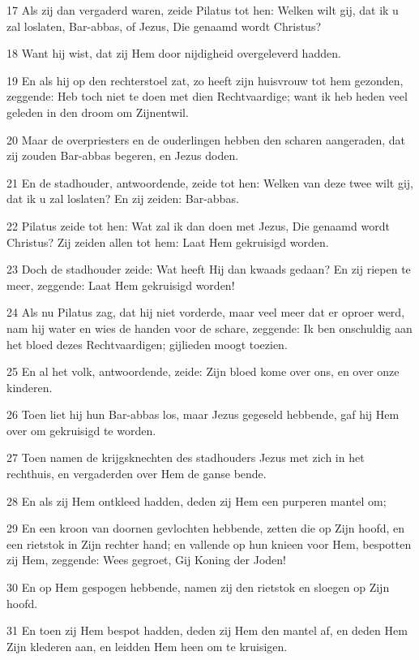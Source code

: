 \par 17 Als zij dan vergaderd waren, zeide Pilatus tot hen: Welken wilt gij, dat ik u zal loslaten, Bar-abbas, of Jezus, Die genaamd wordt Christus?
\par 18 Want hij wist, dat zij Hem door nijdigheid overgeleverd hadden.
\par 19 En als hij op den rechterstoel zat, zo heeft zijn huisvrouw tot hem gezonden, zeggende: Heb toch niet te doen met dien Rechtvaardige; want ik heb heden veel geleden in den droom om Zijnentwil.
\par 20 Maar de overpriesters en de ouderlingen hebben den scharen aangeraden, dat zij zouden Bar-abbas begeren, en Jezus doden.
\par 21 En de stadhouder, antwoordende, zeide tot hen: Welken van deze twee wilt gij, dat ik u zal loslaten? En zij zeiden: Bar-abbas.
\par 22 Pilatus zeide tot hen: Wat zal ik dan doen met Jezus, Die genaamd wordt Christus? Zij zeiden allen tot hem: Laat Hem gekruisigd worden.
\par 23 Doch de stadhouder zeide: Wat heeft Hij dan kwaads gedaan? En zij riepen te meer, zeggende: Laat Hem gekruisigd worden!
\par 24 Als nu Pilatus zag, dat hij niet vorderde, maar veel meer dat er oproer werd, nam hij water en wies de handen voor de schare, zeggende: Ik ben onschuldig aan het bloed dezes Rechtvaardigen; gijlieden moogt toezien.
\par 25 En al het volk, antwoordende, zeide: Zijn bloed kome over ons, en over onze kinderen.
\par 26 Toen liet hij hun Bar-abbas los, maar Jezus gegeseld hebbende, gaf hij Hem over om gekruisigd te worden.
\par 27 Toen namen de krijgsknechten des stadhouders Jezus met zich in het rechthuis, en vergaderden over Hem de ganse bende.
\par 28 En als zij Hem ontkleed hadden, deden zij Hem een purperen mantel om;
\par 29 En een kroon van doornen gevlochten hebbende, zetten die op Zijn hoofd, en een rietstok in Zijn rechter hand; en vallende op hun knieen voor Hem, bespotten zij Hem, zeggende: Wees gegroet, Gij Koning der Joden!
\par 30 En op Hem gespogen hebbende, namen zij den rietstok en sloegen op Zijn hoofd.
\par 31 En toen zij Hem bespot hadden, deden zij Hem den mantel af, en deden Hem Zijn klederen aan, en leidden Hem heen om te kruisigen.
